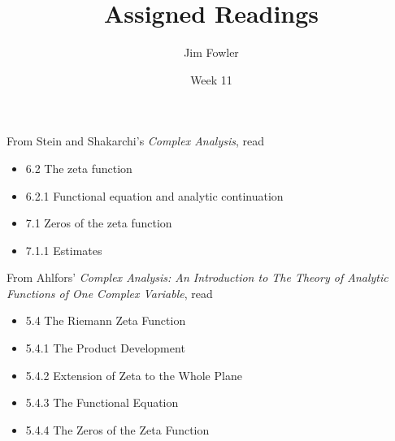 \documentclass{homework}
\author{Jim Fowler}
\title{Assigned Readings}
\date{Week 11}
\begin{document}
\maketitle


From Stein and Shakarchi's \textit{Complex Analysis}, read
\begin{itemize}
\item 6.2 The zeta function
\item 6.2.1 Functional equation and analytic continuation
\item 7.1 Zeros of the zeta function
\item 7.1.1 Estimates
\end{itemize}

From Ahlfors' \textit{Complex Analysis: An Introduction to The Theory of Analytic Functions of One Complex Variable}, read
\begin{itemize}
\item 5.4 The Riemann Zeta Function
\item 5.4.1 The Product Development
\item 5.4.2 Extension of Zeta to the Whole Plane
\item 5.4.3 The Functional Equation
\item 5.4.4 The Zeros of the Zeta Function
\end{itemize}
\end{document}

